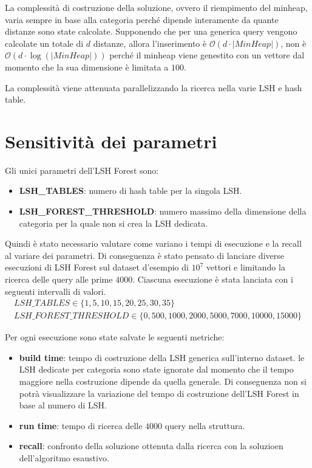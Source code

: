 La complessità di costruzione della soluzione, ovvero il riempimento del minheap,
varia sempre in base alla categoria perché dipende interamente da quante distanze 
sono state calcolate. Supponendo che per una generica query vengono calcolate un 
totale di $d$ distanze, allora l'inserimento è $\mathcal{O}(d\cdot |MinHeap|)$, non è 
$\mathcal{O}(d\cdot \log(|MinHeap|))$ perché il minheap viene genestito con un vettore dal 
momento che la sua dimensione è limitata a $100$.

La complessità viene attenuata parallelizzando la ricerca nella varie LSH e hash table.

\section{Sensitività dei parametri}
Gli unici parametri dell'LSH Forest sono:
\begin{itemize}
    \item \textbf{LSH\_TABLES}: numero di hash table per la singola LSH.
    \item \textbf{LSH\_FOREST\_THRESHOLD}: numero massimo della dimensione della categoria per la
    quale non si crea la LSH dedicata.
\end{itemize} 

Quindi è stato necessario valutare come variano i tempi di esecuzione e la recall
al variare dei parametri. Di conseguenza è stato pensato di lanciare diverse 
esecuzioni di LSH Forest sul dataset d'esempio di $10^7$ vettori e limitando la ricerca delle query alle 
prime $4000$. Ciascuna esecuzione è stata lanciata con i seguenti intervalli di valori.
\begin{equation}
    \begin{array}{c}
        LSH\_TABLES \in \{1, 5, 10, 15, 20, 25, 30, 35\}\\
        LSH\_FOREST\_THRESHOLD \in \{0, 500, 1000, 2000, 5000, 7000, 10000, 15000\}
    \end{array}
\end{equation}

Per ogni esecuzione sono state salvate le seguenti metriche:
\begin{itemize}
    \item \textbf{build time}: tempo di costruzione della LSH generica sull'interno 
    dataset. le LSH dedicate per categoria sono state ignorate dal momento che il tempo maggiore nella costruzione 
    dipende da quella generale. Di conseguenza non si potrà visualizzare la variazione 
    del tempo di costruzione dell'LSH Forest in base al numero di LSH.
    \item \textbf{run time}: tempo di ricerca delle $4000$ query nella struttura.
    \item \textbf{recall}: confronto della soluzione ottenuta dalla ricerca con 
    la soluzioen dell'algoritmo esaustivo.
\end{itemize}

